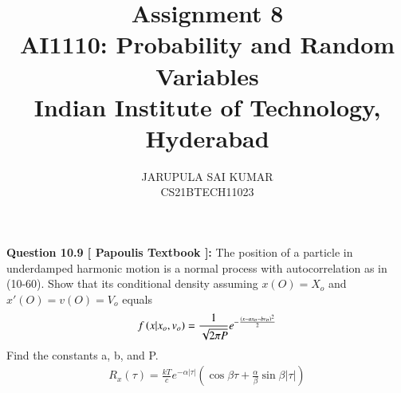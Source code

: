 \documentclass[journal,12pt,twocolumn]{IEEEtran}
\begin{document}
\newcommand*{\perm}[1][-3mu]{\permcomb[#1]{P}}
\newcommand*{\comb}[1][-1mu]{\permcomb[#1]{C}}
\makeatletter
{}
\makeatother
\let\StandardTheFigure\thefigure
\let\vec\mathbf
\renewcommand{\thefigure}{\theproblem}
\def\putbox#1#2#3{\makebox[0in][l]{\makebox[#1][l]{}\raisebox{\baselineskip}[0in][0in]{\raisebox{#2}[0in][0in]{#3}}}}
     \def\rightbox#1{\makebox[0in][r]{#1}}
     \def\centbox#1{\makebox[0in]{#1}}
     \def\topbox#1{\raisebox{-\baselineskip}[0in][0in]{#1}}
     \def\midbox#1{\raisebox{-0.5\baselineskip}[0in][0in]{#1}}
     
\title{\textbf{Assignment 8\\ \Large AI1110: Probability and Random Variables \\ \large Indian Institute of Technology, Hyderabad}}
\author{JARUPULA SAI KUMAR\\ CS21BTECH11023}
\maketitle{}
\textbf{Question 10.9 [ Papoulis Textbook ]:}
The position of a particle in underdamped harmonic motion is a normal process with
autocorrelation as in (10-60).  Show that its conditional density assuming $x(O) = X_o$ and
$x'(O) = v(O) = V_o$ equals
\begin{align}
f\left(x|x_o , v_o\right) = \frac{1}{\sqrt{2\pi P}}e^{-\frac{\left(x-ax_o-bv_o\right)^2}{2}}
\end{align}
Find the  constants a, b, and P. 
\begin{align}
R_{x}(\tau)=\frac{k T}{c} e^{-\alpha|\tau|}\left(\cos \beta \tau+\frac{\alpha}{\beta} \sin \beta|\tau|\right)
\end{align}
\end{document}
